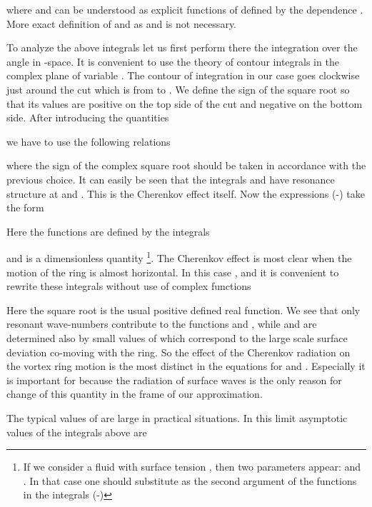 where  and  can be understood as explicit functions of 
defined by the dependence 
. 
More exact definition of  and  as  and 
is not necessary.

To analyze the above integrals let us first perform there the integration over 
the angle  in -space. 
It is convenient to use  the theory of contour integrals in the 
complex plane of variable . The contour  of integration 
in our case goes clockwise just around the cut which is from  to . 
We define the sign of the square root  so 
that its values are positive on 
the top side of the cut and negative on the bottom side. 
After introducing the quantities

we have to use the following relations











where the sign of the complex square root should be taken 
in accordance with the previous choice. 
It can easily be seen that the integrals  and  have resonance
structure at  and . This is the Cherenkov effect itself.
Now the expressions (-) take the form




Here the functions  are defined by the integrals




and  is a dimensionless quantity
\footnote{
If we consider a fluid with surface tension , 
then two parameters appear:  and . 
In that case one should substitute 
as the second argument of the functions  in the integrals
(-)
}.
The Cherenkov effect is  most clear when
the motion of the ring is almost horizontal.
In this case , and it is convenient to rewrite these
integrals without use of complex functions



Here the square root is the usual positive defined real function. 
We see that only resonant wave-numbers contribute 
to the functions  and ,
while   and  are determined also by small values of 
which correspond to the large scale surface deviation  
co-moving with the ring.
So the effect of the Cherenkov radiation on the vortex ring motion
is the most distinct in the equations for  and .
Especially it is important for  because the radiation of surface waves
is the only reason for change of this quantity in the frame of our
approximation.

The typical values of  are large in practical situations. 
In this limit asymptotic values of the integrals above are


